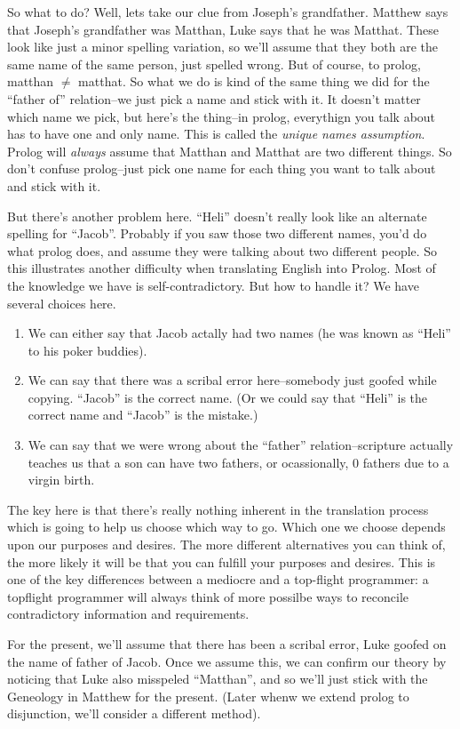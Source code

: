 \documentclass{book}[9pt]
\begin{document}
So what to do?  Well, lets take our clue from Joseph's grandfather.
Matthew says that Joseph's grandfather was Matthan, Luke says that he
was Matthat.  These look like just a minor spelling variation, so
we'll assume that they both are the same name of the same person, just
spelled wrong.  But of course, to prolog, matthan $\neq$ matthat.  So
what we do is kind of the same thing we did for the ``father of''
relation--we just pick a name and stick with it.  It doesn't matter
which name we pick, but here's the thing--in prolog, everythign you
talk about has to have one and only name.  This is called the 
{\em unique names assumption}.  Prolog will {\em always} assume that
Matthan and Matthat are two different things.  So don't confuse
prolog--just pick one name for each thing you want to talk about and
stick with it.  

But there's another problem here.  ``Heli'' doesn't really look like
an alternate spelling for ``Jacob''.  Probably if you saw those two
different names, you'd do what prolog does, and assume they were
talking about two different people.  So this illustrates another
difficulty when translating English into Prolog.  Most of the
knowledge we have is self-contradictory.  But how to handle it?  We
have several choices here.
\begin{enumerate}
\item We can either say that Jacob actally had two names 
(he was known as ``Heli'' to his poker buddies).
\item We can say that there was a scribal error here--somebody just
  goofed while copying.  ``Jacob'' is the correct name.  (Or we could
  say that ``Heli'' is the correct name and ``Jacob'' is the mistake.)
\item We can say that we were wrong about the ``father''
  relation--scripture actually teaches us that a son can have two
  fathers, or ocassionally, 0 fathers due to a virgin birth.
\end{enumerate}
\noindent The key here is that there's really nothing inherent in the
translation process which is going to help us choose which way to go.
Which one we choose depends upon our purposes and desires.  The more
different alternatives you can think of, the more likely it will be
that you can fulfill your purposes and desires.  This is one of the
key differences between a mediocre and a top-flight programmer: a
topflight programmer will always think of more possilbe ways to
reconcile contradictory information and requirements.

For the present, we'll assume that there has been a scribal error,
Luke goofed on the name of father of Jacob.  Once we assume this, we
can confirm our theory by noticing that Luke also misspeled ``Matthan'',
and so we'll just stick with the Geneology in Matthew for the present.
(Later whenw we extend prolog to disjunction, we'll consider a different
method).
\end{document}
